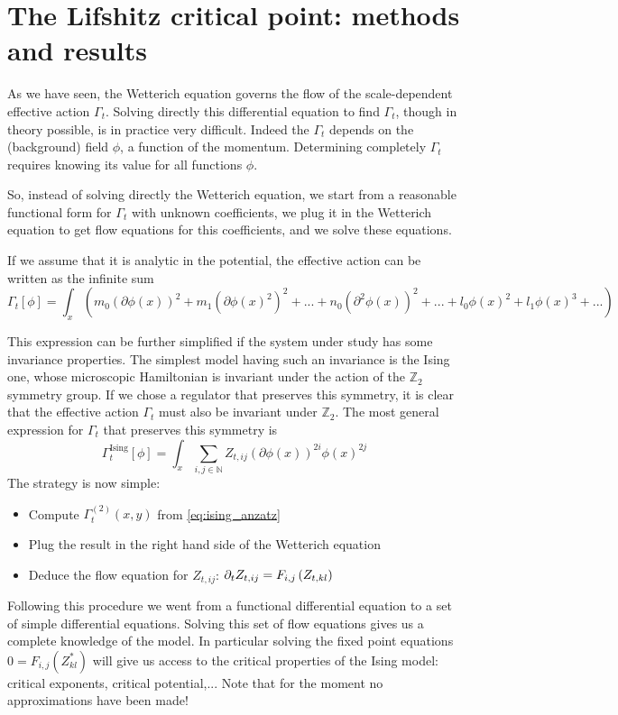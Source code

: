 \chapter{The Lifshitz critical point: methods and results}

As we have seen, the Wetterich equation governs the flow of the scale-dependent effective action $\Gamma_t$. Solving directly this differential equation to find $\Gamma_t$, though in theory possible, is in practice very difficult. Indeed the $\Gamma_t$ depends on the (background) field $\phi$, a function of the momentum. Determining completely $\Gamma_t$ requires knowing its value for all functions $\phi$. 

So, instead of solving directly the Wetterich equation, we start from a reasonable functional form for $\Gamma_t$ with unknown coefficients, we plug it in the Wetterich equation to get flow equations for this coefficients, and we solve these equations.

If we assume that it is analytic in the potential, the effective action can be written as the infinite sum
\begin{equation}
\Gamma_t[\phi] = \int_{x} \left( m_0 (\partial \phi(x))^2 + m_1 (\partial \phi(x)^2)^2 + ... + n_0 (\partial^2 \phi(x))^2 + ... + l_0 \phi(x)^2 + l_1 \phi(x)^3 +... \right)
\end{equation}

This expression can be further simplified if the system under study has some invariance properties. The simplest model having such an invariance is the Ising one, whose microscopic Hamiltonian is invariant under the action of the $\mathds{Z}_2$ symmetry group. If we chose a regulator that preserves this symmetry, it is clear that the effective action $\Gamma_t$ must also be invariant under $\mathds{Z}_2$. The most general expression for $\Gamma_t$ that preserves this symmetry is
\begin{equation}
\label{eq:ising_anzatz}
\Gamma_t^{\text{Ising}}[\phi] = \int_{x} \sum_{i,j \in \mathds{N}} Z_{t,ij} (\partial \phi(x))^{2i} \phi(x)^{2 j}
\end{equation}
The strategy is now simple:
\begin{itemize}
\item Compute $\Gamma_t^{(2)}(x,y)$ from \eqref{eq:ising_anzatz}
\item Plug the result in the right hand side of the Wetterich equation
\item Deduce the flow equation for $Z_{t,ij}$: $\partial_{t} Z_{t,ij} = F_{i,j}\left( {Z_{t,kl}} \right)$
\end{itemize}
Following this procedure we went from a functional differential equation to a set of simple differential equations. Solving this set of flow equations gives us a complete knowledge of the model. In particular solving the fixed point equations $0 = F_{i,j}\left( {Z^*_{kl}} \right)$ will give us access to the critical properties of the Ising model: critical exponents, critical potential,... Note that for the moment no approximations have been made!

